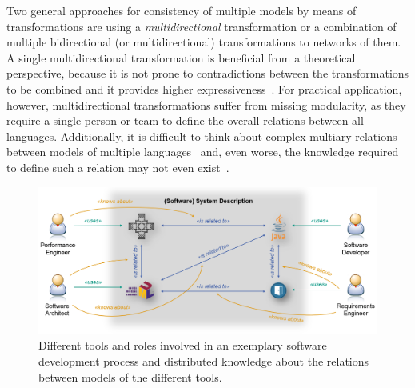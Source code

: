 Two general approaches for consistency of multiple %
models by means of transformations are using a \emph{multidirectional} transformation or a combination of multiple bidirectional (or multidirectional) transformations to networks of them.
A single multidirectional transformation is beneficial from a theoretical perspective, because it is not prone to contradictions between the transformations to be combined and it provides higher expressiveness~\cite{stevens2020BidirectionalTransformationLarge-SoSym}.
For practical application, however, multidirectional transformations suffer from missing modularity, as they require a single person or team to define the overall relations between all languages.
Additionally, it is difficult to think about complex multiary relations between models of multiple languages~\cite{stevens2020BidirectionalTransformationLarge-SoSym} and, even worse, the knowledge required to define such a relation may not even exist~.

\begin{figure}
    \centering
    \includegraphics[width=\textwidth]{figures/prologue/introduction/distributed_knowledge.png}
    \caption[Tools and distributed knowledge in engineering processes]{Different tools and roles involved in an exemplary software development process and distributed knowledge about the relations between models of the different tools.}
    \label{fig:introduction:distributed_knowledge}
\end{figure}

